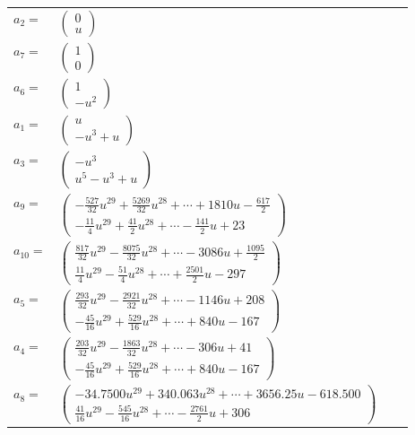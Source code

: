 \documentclass[1p]{elsarticle_modified}
\theoremstyle{definition}
\begin{document}
\begin{tabular}{m{7pt} m{180pt} m{7pt} m{180pt} }
\flushright $a_{2}=$&$\begin{pmatrix}0\\u\end{pmatrix}$ \\
\flushright $a_{7}=$&$\begin{pmatrix}1\\0\end{pmatrix}$ \\
\flushright $a_{6}=$&$\begin{pmatrix}1\\- u^2\end{pmatrix}$ \\
\flushright $a_{1}=$&$\begin{pmatrix}u\\- u^3+u\end{pmatrix}$ \\
\flushright $a_{3}=$&$\begin{pmatrix}- u^3\\u^5- u^3+u\end{pmatrix}$ \\
\flushright $a_{9}=$&$\begin{pmatrix}-\frac{527}{32} u^{29}+\frac{5269}{32} u^{28}+\cdots+1810 u-\frac{617}{2}\\-\frac{11}{4} u^{29}+\frac{41}{2} u^{28}+\cdots-\frac{141}{2} u+23\end{pmatrix}$ \\
\flushright $a_{10}=$&$\begin{pmatrix}\frac{817}{32} u^{29}-\frac{8075}{32} u^{28}+\cdots-3086 u+\frac{1095}{2}\\\frac{11}{4} u^{29}-\frac{51}{4} u^{28}+\cdots+\frac{2501}{2} u-297\end{pmatrix}$ \\
\flushright $a_{5}=$&$\begin{pmatrix}\frac{293}{32} u^{29}-\frac{2921}{32} u^{28}+\cdots-1146 u+208\\-\frac{45}{16} u^{29}+\frac{529}{16} u^{28}+\cdots+840 u-167\end{pmatrix}$ \\
\flushright $a_{4}=$&$\begin{pmatrix}\frac{203}{32} u^{29}-\frac{1863}{32} u^{28}+\cdots-306 u+41\\-\frac{45}{16} u^{29}+\frac{529}{16} u^{28}+\cdots+840 u-167\end{pmatrix}$ \\
\flushright $a_{8}=$&$\begin{pmatrix}-34.7500 u^{29}+340.063 u^{28}+\cdots+3656.25 u-618.500\\\frac{41}{16} u^{29}-\frac{545}{16} u^{28}+\cdots-\frac{2761}{2} u+306\end{pmatrix}$ \\

\end{tabular}
\end{document}
